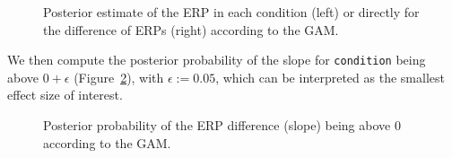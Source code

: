 \documentclass[
  doc,
  floatsintext,
  longtable,
  a4paper,
  nolmodern,
  notxfonts,
  notimes,
  colorlinks=true,linkcolor=blue,citecolor=blue,urlcolor=blue]{apa7}
\begin{document}
\begin{figure}[!htb]

\caption{\label{fig-plot-post-slope}Posterior estimate of the ERP in
each condition (left) or directly for the difference of ERPs (right)
according to the GAM.}


\end{figure}%

We then compute the posterior probability of the slope for
\texttt{condition} being above \(0+\epsilon\)
(Figure~\ref{fig-post-prob-test}), with \(\epsilon := 0.05\), which can
be interpreted as the smallest effect size of interest.

\begin{figure}[!htb]

\caption{\label{fig-post-prob-test}Posterior probability of the ERP
difference (slope) being above 0 according to the GAM.}


\end{figure}%
\end{document}
